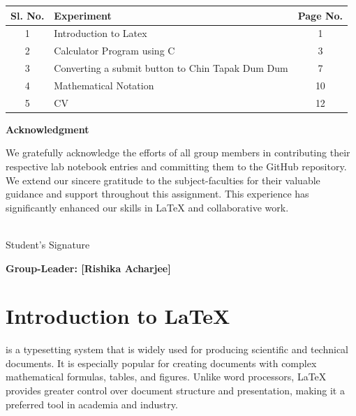 \documentclass{article}
\begin{document}
\vspace{1cm}

\begin{tabular}{|c|p{10cm}|c|}
    \hline
    \textbf{Sl. No.} & \textbf{Experiment} & \textbf{Page No.} \\
    \hline
    1 & Introduction to Latex & 1\\
    \hline
    2 & Calculator Program using C & 3\\
    \hline
    3 & Converting a submit button to Chin Tapak Dum Dum & 7 \\
    \hline
    4 & Mathematical Notation & 10\\
    \hline
    5 & CV & 12 \\
    \hline

\end{tabular}
\newpage

\begin{titlepage}
    \centering
    \vspace*{\fill}
    
    \Huge \textbf{Acknowledgment}
    
    \vspace{1cm}
    
    \large
    We gratefully acknowledge the efforts of all group members in contributing their respective lab notebook entries and committing them to the GitHub repository. We extend our sincere gratitude to the subject-faculties for their valuable guidance and support throughout this assignment. This experience has significantly enhanced our skills in LaTeX and collaborative work.
    
    \vspace*{\fill}
    
    \begin{flushright}
    
        \vspace{2cm}
        \underline{\hspace{3.7cm}}
        \\
        Student's Signature
    \end{flushright}
\end{titlepage}

\newpage
\pagestyle{plain}
\fancyhf{}
\begin{center}
    \textbf{\LARGE{{Group-Leader: [Rishika Acharjee]}}}
\end{center}
\section{Introduction to \LaTeX} is a typesetting system that is widely used for producing scientific and technical documents. It is especially popular for creating documents with complex mathematical formulas, tables, and figures. Unlike word processors, \LaTeX{} provides greater control over document structure and presentation, making it a preferred tool in academia and industry.
\end{document}
